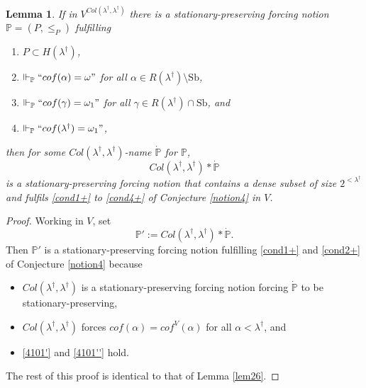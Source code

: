 \documentclass[12pt, twoside]{memoir}
\numberwithin{equation}{section}
\newtheorem{lem}[thm]{Lemma}
\theoremstyle{definition}
\theoremstyle{remark}
\theoremstyle{definition}
\theoremstyle{definition}
\theoremstyle{definition}
\theoremstyle{remark}
\begin{document}
\begin{lem}\label{lem26an}
If in $V^{Col(\lambda^{\dagger}, \lambda^{\dagger})}$ there is a stationary-preserving forcing notion $\mathbb{P} = (P, \leq_P)$ fulfilling 
\begin{enumerate}[label=(\arabic*')]
    \item\label{4100'} $P \subset H(\lambda^{\dagger})$, 
    \item\label{4101'} $\Vdash_{\mathbb{P}} ``cof(\alpha) = \omega"$ for all $\alpha \in R(\lambda^{\dagger}) \setminus \mathrm{Sb}$,
    \item\label{4101''} $\Vdash_{\mathbb{P}} ``cof(\gamma) = \omega_1"$ for all $\gamma \in R(\lambda^{\dagger}) \cap \mathrm{Sb}$, and
    \item\label{4102'} $\Vdash_{\mathbb{P}} ``cof(\lambda^{\dagger}) = \omega_1"$,
\end{enumerate}
then for some $Col(\lambda^{\dagger}, \lambda^{\dagger})$-name $\dot{\mathbb{P}}$ for $\mathbb{P}$,
\begin{equation*}
    Col(\lambda^{\dagger}, \lambda^{\dagger}) * \dot{\mathbb{P}}
\end{equation*} 
is a stationary-preserving forcing notion that contains a dense subset of size $2^{< \lambda^{\dagger}}$ and fulfils \ref{cond1+} to \ref{cond4+} of Conjecture \ref{notion4} in $V$.
\end{lem}

\begin{proof}
Working in $V$, set 
\begin{equation*}
    \mathbb{P}' := Col(\lambda^{\dagger}, \lambda^{\dagger}) * \dot{\mathbb{P}} \text{.}
\end{equation*} 
Then $\mathbb{P}'$ is a stationary-preserving forcing notion fulfilling \ref{cond1+} and \ref{cond2+} of Conjecture \ref{notion4} because 
\begin{itemize}
    \item $Col(\lambda^{\dagger}, \lambda^{\dagger})$ is a stationary-preserving forcing notion forcing $\dot{\mathbb{P}}$ to be stationary-preserving, 
    \item $Col(\lambda^{\dagger}, \lambda^{\dagger})$ forces $cof(\alpha) = cof^{V}(\alpha)$ for all $ \alpha < \lambda^{\dagger}$, and
    \item \ref{4101'} and \ref{4101''} hold.
\end{itemize}
The rest of this proof is identical to that of Lemma \ref{lem26}.
\end{proof}
\end{document}
